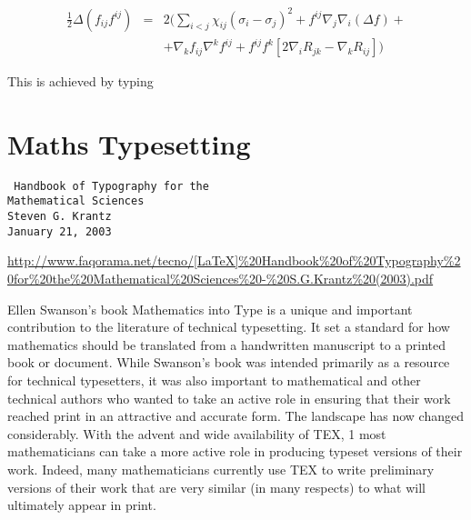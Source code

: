 {\arraycolsep=2pt
 \begin{equation}
 \begin{array}{rcl}
 \frac{1}{2}\Delta(f_{ij}f^{ij}) & = & 2\Bigg({\displaystyle
 \sum_{i<j}}\chi_{ij}(\sigma_{i}-\sigma_{j})^{2}+f^{ij}%
 \nabla_{j}\nabla_{i}(\Delta f)+\\
 & & +\nabla_{k}f_{ij}\nabla^{k}f^{ij}+f^{ij}f^{k}[2
 \nabla_{i}R_{jk}-\nabla_{k}R_{ij}]\Bigg)
 \end{array}
 \end{equation}

This is achieved by typing

\begin{teX}
{\arraycolsep=2pt
 \begin{equation}
 \begin{array}{rcl}
 \frac{1}{2}\Delta(f_{ij}f^{ij}) & = & 2\Bigg({\displaystyle
 \sum_{i<j}}\chi_{ij}(\sigma_{i}-\sigma_{j})^{2}+f^{ij}%
 \nabla_{j}\nabla_{i}(\Delta f)+\\
 & & +\nabla_{k}f_{ij}\nabla^{k}f^{ij}+f^{ij}f^{k}[2
 \nabla_{i}R_{jk}-\nabla_{k}R_{ij}]\Bigg)
 \end{array}
 \end{equation}

\end{teX}





\section{Maths Typesetting}

\texttt{
Handbook of Typography for the\\
Mathematical Sciences\\
Steven G. Krantz\\
January 21, 2003}\par

\url{http://www.faqorama.net/tecno/[LaTeX]%20Handbook%20of%20Typography%20for%20the%20Mathematical%20Sciences%20-%20S.G.Krantz%20(2003).pdf}


Ellen Swanson’s book Mathematics into Type is a unique and important contribution to the literature of technical typesetting. It set a
standard for how mathematics should be translated from a handwritten
manuscript to a printed book or document. While Swanson’s book was
intended primarily as a resource for technical typesetters, it was also important to mathematical and other technical authors who wanted to take
an active role in ensuring that their work reached print in an attractive
and accurate form.
The landscape has now changed considerably. With the advent and
wide availability of TEX,
1
most mathematicians can take a more active
role in producing typeset versions of their work. Indeed, many mathematicians currently use TEX to write preliminary versions of their work
that are very similar (in many respects) to what will ultimately appear
in print.

}
